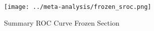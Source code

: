 \begin{figure}[p]
\centering

\texttt{[image: ../meta-analysis/frozen\_sroc.png]}

\caption[Summary ROC Curve Frozen Section]{Summary ROC Curve Frozen Section}
\label{fig:frozen_sroc}
\end{figure}
